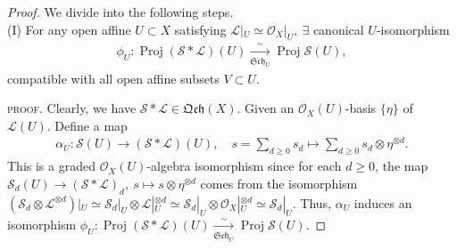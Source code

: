\documentclass[11pt,a4paper,footinclude=true,headinclude=true]{scrbook} %
\DeclareMathOperator{\Proj}{Proj}
\newcommand{\LL}{\mathscr{L}}
\newcommand{\OO}{\mathcal{O}}
\newcommand{\Ss}{\mathscr{S}}
\newcommand{\Sch}{\mathfrak{Sch}}
\newcommand{\<}{\langle}
\newcommand{\>}{\rangle}
\newcommand{\qcoh}{\mathfrak{Qch}}
\begin{document}
\begin{proof}
    We divide into the following steps.\\
    
    (I) For any open affine $U\subset X$ satisfying $\LL|_U\simeq\OO_X|_U,\ \exists$ canonical $U$-isomorphism
    \begin{align*}
        \phi_U:\Proj(\Ss\ast\LL)(U)\xrightarrow[\Sch_U]{\sim}\Proj\Ss(U),
    \end{align*}
    compatible with all open affine subsets $V\subset U$.
    
    \textsc{proof.} Clearly, we have $\Ss\ast\LL\in\qcoh(X)$. Given an $\OO_X(U)$-basis $\{\eta\}$ of $\LL(U)$. Define a map 
    \begin{align*}
        \alpha_U:\Ss(U)\longrightarrow(\Ss\ast\LL)(U),\quad s=\sum_{d\geq0}s_d\longmapsto\sum_{d\geq0}s_d\otimes\eta^{\otimes d}.
    \end{align*}
    This is a graded $\OO_X(U)$-algebra isomorphism since for each $d\geq0$, the map $\Ss_d(U)\to(\Ss\ast\LL)_d,\ s\mapsto s\otimes\eta^{\otimes d}$ comes from the isomorphism $(\Ss_d\otimes\LL^{\otimes d})|_U\simeq\Ss_d|_U\otimes\LL|_U^{\otimes d}\simeq\Ss_d|_U\otimes\OO_X|_U^{\otimes d}\simeq\Ss_d|_U$. Thus, $\alpha_U$ induces an isomorphism $\phi_U:\Proj(\Ss\ast\LL)(U)\xrightarrow[\Sch_U]{\sim}\Proj\Ss(U)$.
    

\end{proof}
\end{document}
